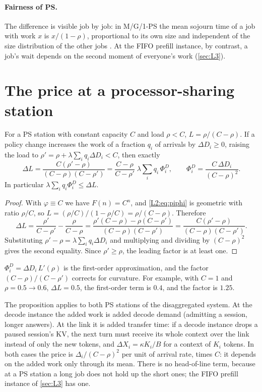 \paragraph{Fairness of PS.} The difference is visible job by job: in M/G/1-PS the
mean sojourn time of a job with work $x$ is $x/(1-\rho)$, proportional to its own size
and independent of the size distribution of the other jobs \cite{kleinrock1976}. At
the FIFO prefill instance, by contrast, a job's wait depends on the second moment of
everyone's work (\cref{sec:L3}).

\section{The price at a processor-sharing station}

\begin{proposition}\label{prop:decode-price}
For a PS station with constant capacity $C$ and load $\rho<C$, $L=\rho/(C-\rho)$. If a
policy change increases the work of a fraction $q_i$ of arrivals by $\Delta D_i\ge0$,
raising the load to $\rho'=\rho+\lambda\sum_iq_i\Delta D_i<C$, then exactly
\[
  \Delta L=\frac{C(\rho'-\rho)}{(C-\rho)(C-\rho')}
  =\frac{C-\rho}{C-\rho'}\;\lambda\sum_iq_i\,\Phi^D_i,\qquad
  \Phi^D_i=\frac{C\,\Delta D_i}{(C-\rho)^2} .
\]
In particular $\lambda\sum_iq_i\Phi^D_i\le\Delta L$.
\end{proposition}
\begin{proof}
With $\varphi\equiv C$ we have $F(n)=C^n$, and \eqref{L2:eq:piphi} is geometric with
ratio $\rho/C$, so $L=(\rho/C)/(1-\rho/C)=\rho/(C-\rho)$. Therefore
\[
  \Delta L=\frac{\rho'}{C-\rho'}-\frac{\rho}{C-\rho}=\frac{\rho'(C-\rho)-\rho(C-\rho')}{(C-\rho)(C-\rho')}
  =\frac{C(\rho'-\rho)}{(C-\rho)(C-\rho')} .
\]
Substituting $\rho'-\rho=\lambda\sum_iq_i\Delta D_i$ and multiplying and dividing by
$(C-\rho)^2$ gives the second equality. Since $\rho'\ge\rho$, the leading factor is at
least one.
\end{proof}

$\Phi^D_i=\Delta D_i\,L'(\rho)$ is the first-order approximation, and the factor
$(C-\rho)/(C-\rho')$ corrects for curvature. For example, with $C=1$ and
$\rho=0.5\to0.6$, $\Delta L=0.5$, the first-order term is $0.4$, and the factor is
$1.25$.

The proposition applies to both PS stations of the disaggregated system. At the decode
instance the added work is added decode demand (admitting a session, longer answers).
At the link it is added transfer time: if a decode instance drops a paused session's
KV, the next turn must receive its whole context over the link instead of only the new
tokens, and $\Delta X_i=\kappa K_i/B$ for a context of $K_i$ tokens. In both cases the
price is $\Delta_i/(C-\rho)^2$ per unit of arrival rate, times $C$: it depends on the
added work only through its mean. There is no head-of-line term, because at a PS
station a long job does not hold up the short ones; the FIFO prefill instance of
\cref{sec:L3} has one.

